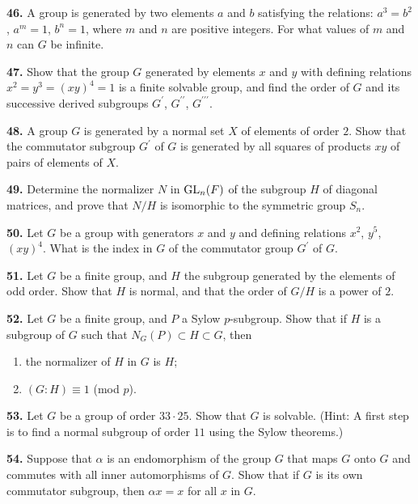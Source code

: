 \documentclass[a4paper,11pt,final,openany]{memoir}%
\theoremstyle{nonumberplain}
\begin{document}
\medskip\noindent\textbf{46.} A group is generated by two elements $a$ and $b
$ satisfying the relations: $a^{3}=b^{2}$, $a^{m}=1$, $b^{n}=1$, where $m$ and
$n$ are positive integers. For what values of $m$ and $n$ can $G$ be infinite.

\medskip\noindent\textbf{47.} Show that the group $G$ generated by elements
$x$ and $y$ with defining relations $x^{2}=y^{3}=(xy)^{4}=1$ is a finite
solvable group, and find the order of $G$ and its successive derived subgroups
$G^{\prime}$, $G^{\prime\prime}$, $G^{\prime\prime\prime}$.

\medskip\noindent\textbf{48.} A group $G$ is generated by a normal set $X$ of
elements of order $2$. Show that the commutator subgroup $G^{\prime}$ of $G$
is generated by all squares of products $xy$ of pairs of elements of $X$.

\medskip\noindent\textbf{49.} Determine the normalizer $N$ in $\operatorname{GL}_{n}(F)$ of
the subgroup $H$ of diagonal matrices, and prove that $N/H$ is isomorphic to
the symmetric group $S_{n}$.

\medskip\noindent\textbf{50.} Let $G$ be a group with generators $x$ and $y$
and defining relations $x^{2}$, $y^{5}$, $(xy)^{4}$. What is the index in $G$
of the commutator group $G^{\prime}$ of $G$.

\medskip\noindent\textbf{51.} Let $G$ be a finite group, and $H$ the subgroup
generated by the elements of odd order. Show that $H$ is normal, and that the
order of $G/H$ is a power of $2$.

\medskip\noindent\textbf{52.} Let $G$ be a finite group, and $P$ a Sylow
$p$-subgroup. Show that if $H$ is a subgroup of $G$ such that $N_{G}(P)\subset
H\subset G$, then

\begin{enumerate}
\item the normalizer of $H$ in $G$ is $H$;

\item $(G:H)\equiv1$ (mod $p$).
\end{enumerate}

\medskip\noindent\textbf{53.} Let $G$ be a group of order $33\cdot25$. Show
that $G$ is solvable. (Hint: A first step is to find a normal subgroup of
order $11$ using the Sylow theorems.)

\medskip\noindent\textbf{54.} Suppose that $\alpha$ is an endomorphism of the
group $G$ that maps $G$ onto $G$ and commutes with all inner automorphisms of
$G$. Show that if $G$ is its own commutator subgroup, then $\alpha x=x$ for
all $x$ in $G$.
\end{document}
